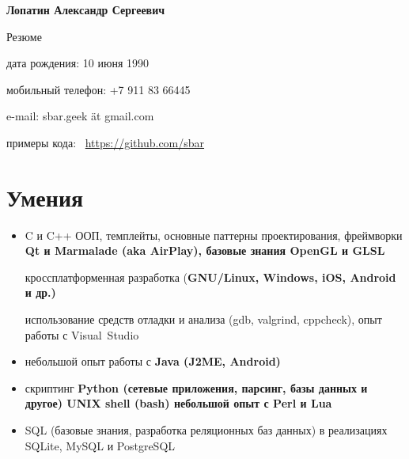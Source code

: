 \begin{center}
\fontsize{16pt}{14pt}\selectfont
\bfseries Лопатин Александр Сергеевич\mdseries

\fontsize{14pt}{14pt}\selectfont
Резюме
\end{center}
{
\fontsize{12pt}{12pt}\selectfont
\begin{flushright}
\item дата рождения: 10 июня 1990
\item мобильный телефон: +7 911 83 66445
\item e-mail: sbar.geek ät gmail.com
\item примеры кода: \
\href{https://github.com/sbar?tab=repositories}{https://github.com/sbar}
\end{flushright}
}

\setcounter{section}{0}
\section{Умения}
\begin{itemize}
\item C и C++
\subitem ООП, темплейты, основные паттерны проектирования,
фреймворки
\bfseries Qt \mdseries и
\bfseries Marmalade \mdseries
(aka \bfseries AirPlay\mdseries),
базовые знания \bfseries OpenGL \mdseries и \bfseries GLSL\mdseries

\subitem кроссплатформенная разработка
(\bfseries GNU/Linux\mdseries, Windows, iOS, \bfseries Android \mdseries и др.)

\subitem использование средств отладки и анализа (gdb, valgrind, cppcheck),
опыт работы с Visual~Studio

\item небольшой опыт работы с \bfseries Java \mdseries (J2ME, Android)

\item скриптинг
\subitem \bfseries Python \mdseries
(сетевые приложения, парсинг, базы данных и другое)
\subitem \bfseries UNIX shell (bash)\mdseries
\subitem небольшой опыт с \bfseries Perl \mdseries и \bfseries Lua\mdseries

\item SQL (базовые знания, разработка реляционных баз данных)
в реализациях SQLite, MySQL и PostgreSQL
\end{itemize}

